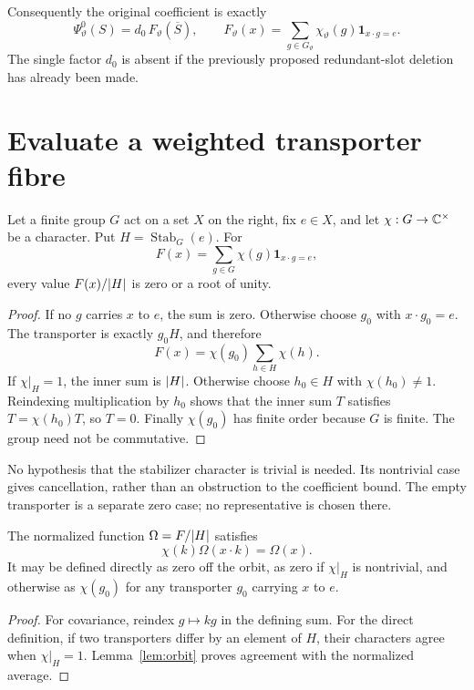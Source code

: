 Consequently the original coefficient is exactly
\begin{equation}\label{eq:average}
 \Psi^0_\vartheta(S)=d_0\,F_\vartheta(\overline S),
 \qquad
 F_\vartheta(x)=\sum_{g\in G_\vartheta}\chi_\vartheta(g)
                              \mathbf1_{x\cdot g=e}.
\end{equation}
The single factor $d_0$ is absent if the previously proposed redundant-slot deletion has already been made.

\section{Evaluate a weighted transporter fibre}
\label{sec:orbit}

\begin{lemma}\label{lem:orbit}
Let a finite group $G$ act on a set $X$ on the right, fix $e\in X$, and let $\chi:G\to\mathbb C^\times$ be a character. Put $H=\operatorname{Stab}_G(e)$. For
\[
 F(x)=\sum_{g\in G}\chi(g)\mathbf1_{x\cdot g=e},
\]
every value $F(x)/\lvert H\rvert$ is zero or a root of unity.
\end{lemma}
\begin{proof}
If no $g$ carries $x$ to $e$, the sum is zero. Otherwise choose $g_0$ with $x\cdot g_0=e$. The transporter is exactly $g_0H$, and therefore
\[
 F(x)=\chi(g_0)\sum_{h\in H}\chi(h).
\]
If $\chi|_H=1$, the inner sum is $\lvert H\rvert$. Otherwise choose $h_0\in H$ with $\chi(h_0)\ne1$. Reindexing multiplication by $h_0$ shows that the inner sum $T$ satisfies $T=\chi(h_0)T$, so $T=0$. Finally $\chi(g_0)$ has finite order because $G$ is finite. The group need not be commutative.
\end{proof}

No hypothesis that the stabilizer character is trivial is needed. Its nontrivial case gives cancellation, rather than an obstruction to the coefficient bound. The empty transporter is a separate zero case; no representative is chosen there.

\begin{corollary}
The normalized function $\Omega=F/\lvert H\rvert$ satisfies
\[
 \chi(k)\Omega(x\cdot k)=\Omega(x).
\]
It may be defined directly as zero off the orbit, as zero if $\chi|_H$ is nontrivial, and otherwise as $\chi(g_0)$ for any transporter $g_0$ carrying $x$ to $e$.
\end{corollary}
\begin{proof}
For covariance, reindex $g\mapsto kg$ in the defining sum. For the direct definition, if two transporters differ by an element of $H$, their characters agree when $\chi|_H=1$. Lemma~\ref{lem:orbit} proves agreement with the normalized average.
\end{proof}

